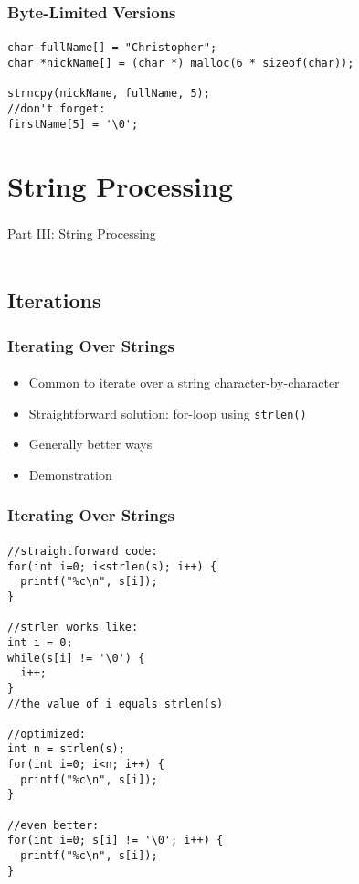 \documentclass[]{beamer}
\begin{document}
\begin{frame}[fragile]
    \frametitle{Byte-Limited Versions}
    \framesubtitle{}

\begin{verbatim}
char fullName[] = "Christopher";
char *nickName[] = (char *) malloc(6 * sizeof(char));

strncpy(nickName, fullName, 5);
//don't forget:
firstName[5] = '\0';
\end{verbatim}

\end{frame}

\section{String Processing}

\begin{frame}
    \frametitle{}
    \framesubtitle{}
    
    \begin{center}
    {\Huge Part III: String Processing}\\
    {\Large ~}
    
    \end{center}

\end{frame}

\subsection{Iterations}

\begin{frame}[fragile]
  \frametitle{Iterating Over Strings}
  \framesubtitle{}

\begin{itemize}[<+->]
  \item Common to iterate over a string character-by-character
  \item Straightforward solution: for-loop using \texttt{strlen()}
  \item Generally better ways
  \item Demonstration
\end{itemize}

\end{frame}

\begin{frame}[fragile]
  \frametitle{Iterating Over Strings}
  \framesubtitle{}

\begin{verbatim}
//straightforward code:
for(int i=0; i<strlen(s); i++) { 
  printf("%c\n", s[i]);
}

//strlen works like:
int i = 0;
while(s[i] != '\0') {
  i++;
}
//the value of i equals strlen(s)

//optimized:
int n = strlen(s);
for(int i=0; i<n; i++) { 
  printf("%c\n", s[i]);
}

//even better:
for(int i=0; s[i] != '\0'; i++) {
  printf("%c\n", s[i]);
}
\end{verbatim}

\end{frame}
\end{document}
